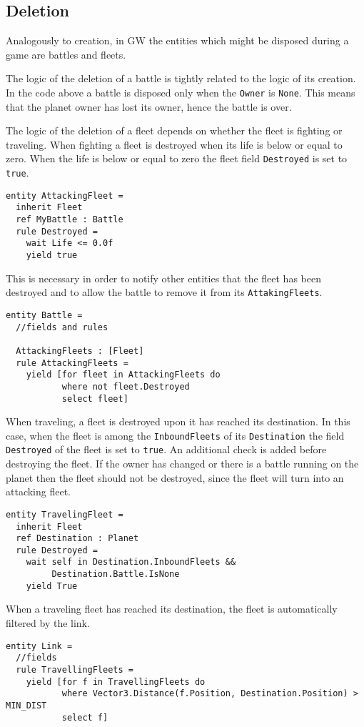 \subsection{Deletion}
Analogously to creation, in GW the entities which might be disposed during a game are battles and fleets. 


The logic of the deletion of a battle is tightly related to the logic of its creation. In the code above a battle is disposed only when the \texttt{Owner} is \texttt{None}. This means that the planet owner has lost its owner, hence the battle is over.

The logic of the deletion of a fleet depends on whether the fleet is fighting or traveling. When fighting a fleet is destroyed when its life is below or equal to zero. When the life is below or equal to zero the fleet field \texttt{Destroyed} is set to \texttt{true}.
\begin{lstlisting}
entity AttackingFleet =
  inherit Fleet
  ref MyBattle : Battle
  rule Destroyed =
    wait Life <= 0.0f
    yield true
\end{lstlisting}

This is necessary in order to notify other entities that the fleet has been destroyed and to allow the battle to remove it from its \texttt{AttakingFleets}.
\begin{lstlisting}
entity Battle =  
  //fields and rules

  AttackingFleets : [Fleet]
  rule AttackingFleets =
    yield [for fleet in AttackingFleets do
           where not fleet.Destroyed
           select fleet]
\end{lstlisting}

When traveling, a fleet is destroyed upon it has reached its destination. In this case, when the fleet is among the \texttt{InboundFleets} of its \texttt{Destination} the field \texttt{Destroyed} of the fleet is set to \texttt{true}. An additional check is added before destroying the fleet. If the owner has changed or there is a battle running on the planet then the fleet should not be destroyed, since the fleet will turn into an attacking fleet. 
\begin{lstlisting}
entity TravelingFleet =
  inherit Fleet
  ref Destination : Planet
  rule Destroyed =
    wait self in Destination.InboundFleets &&
         Destination.Battle.IsNone         
    yield True
\end{lstlisting}

When a traveling fleet has reached its destination, the fleet is automatically filtered by the link. 
\begin{lstlisting}
entity Link =
  //fields
  rule TravellingFleets =
    yield [for f in TravellingFleets do
           where Vector3.Distance(f.Position, Destination.Position) > MIN_DIST
           select f]
\end{lstlisting}

